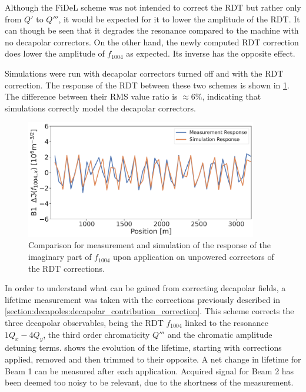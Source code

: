 Although the FiDeL scheme was not intended to correct the RDT but rather only from $Q'$ to $Q'''$,
it would be expected for it to lower the amplitude of the RDT. It can though be seen that it
degrades the resonance compared to the machine with no decapolar correctors. On the other hand, the
newly computed RDT correction does lower the amplitude of $f_{1004}$ as expected.  Its inverse has
the opposite effect.

Simulations were run with decapolar correctors turned off and with the RDT
correction. The response of the RDT between these two schemes is shown in
\cref{fig:decapoles:rdt:b1_response_corr}. The difference between their RMS value ratio is $\approx
6\%$, indicating that simulations correctly model the decapolar correctors.

\begin{figure}[!htb]
    \centering
    \includegraphics[width=0.9\textwidth]{./images/f1004/b1_response_rdt_corr.pdf}
    \caption{Comparison for measurement and simulation of the response of the imaginary part of
    $f_{1004}$ upon application on unpowered correctors of the RDT corrections.}
    \label{fig:decapoles:rdt:b1_response_corr}
\end{figure}


In order to understand what can be gained from correcting decapolar fields, a lifetime measurement
was taken with the corrections previously described in
\cref{section:decapoles:decapolar_contribution_correction}. This scheme corrects the three decapolar 
observables, being the RDT $f_{1004}$ linked to the resonance $1Q_x - 4Q_y$, the third order
chromaticity $Q'''$ and the chromatic amplitude detuning terms.
 shows the evolution of the lifetime, starting with
corrections applied, removed and then trimmed to their opposite. A net change in lifetime for Beam 1
can be measured after each application. Acquired signal for Beam 2 has been deemed too noisy to be 
relevant, due to the shortness of the measurement.

